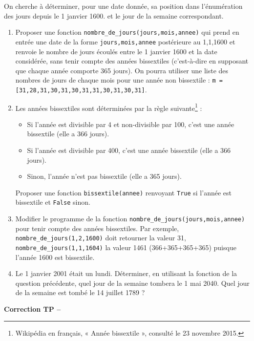 On cherche à déterminer, pour une date donnée, sa position dans l'énumération des jours depuis le 1 janvier 1600. et le jour de la semaine correspondant.

\begin{enumerate}
 \item Proposer une fonction \texttt{nombre\_de\_jours(jours,mois,annee)} qui prend en entrée une date de la forme \texttt{jours,mois,annee} postérieure au 1,1,1600 et renvoie le nombre de jours écoulés entre le 1 janvier 1600 et la date considérée, sans tenir compte des années bissextiles (c'est-à-dire en supposant que chaque année comporte 365 jours). On pourra utiliser une liste des nombres de jours de chaque mois pour une année non bissextile : \texttt{m = [31,28,31,30,31,30,31,31,30,31,30,31]}.

\item Les années bissextiles sont déterminées par la règle suivante\footnote{Wikipédia en français, « Année bissextile », consulté le 23 novembre 2015.} : 
\begin{itemize}
\item Si l'année est divisible par 4 et non-divisible par 100, c'est une année bissextile (elle a 366 jours).
\item Si l'année est divisible par 400, c'est une année bissextile (elle a 366 jours).
\item Sinon, l'année n'est pas bissextile (elle a 365 jours).
\end{itemize} 

Proposer une fonction \texttt{bissextile(annee)} renvoyant \texttt{True} si l'année est bissextile et \texttt{False} sinon.

 \item Modifier le programme de la fonction \texttt{nombre\_de\_jours(jours,mois,annee)} pour tenir compte des années bissextiles. Par exemple, \texttt{nombre\_de\_jours(1,2,1600)} doit retourner la valeur 31, \texttt{nombre\_de\_jours(1,1,1604)} la valeur 1461 (366+365+365+365) puisque l'année 1600 est bissextile.
 
 \item Le 1 janvier 2001 était un lundi. Déterminer, en utilisant la fonction de la question précédente, quel jour de la semaine tombera le 1 mai 2040. Quel jour de la semaine est tombé le 14 juillet 1789 ?
\end{enumerate}

\ifdef{\public}{}{}
\cleardoublepage
\renewcommand{\type}{Correction TP}
\setcounter{section}{0}
\setcounter{listing}{0}
\begin{center}
{\Large\bf {\type} \no {\num} -- \descrip}
\end{center}

